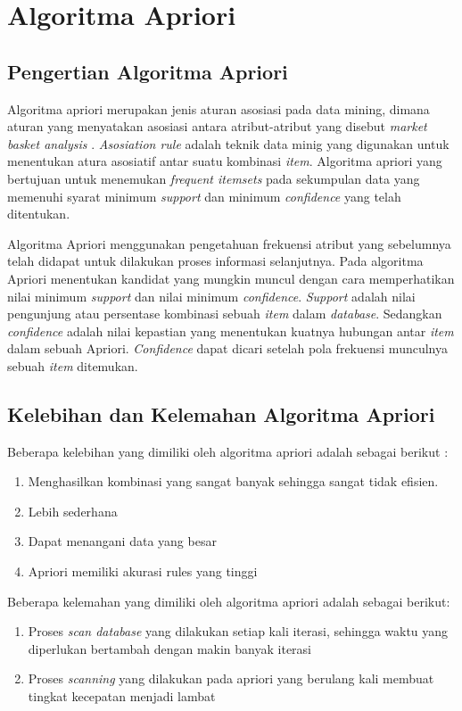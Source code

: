 \section{Algoritma Apriori}
\subsection{Pengertian Algoritma Apriori}
Algoritma apriori merupakan jenis aturan asosiasi pada data mining, dimana aturan yang menyatakan asosiasi antara atribut-atribut yang disebut \textit{market basket analysis} \cite{ye2006parallel}. \textit{Asosiation rule} adalah teknik data minig yang digunakan untuk menentukan atura asosiatif antar suatu kombinasi \textit{item}. Algoritma apriori yang bertujuan untuk menemukan \textit{frequent itemsets} pada sekumpulan data yang memenuhi syarat minimum \textit{support} dan minimum \textit{confidence} yang telah ditentukan.
\par
Algoritma Apriori menggunakan pengetahuan frekuensi atribut yang  sebelumnya telah didapat untuk dilakukan proses informasi selanjutnya. Pada algoritma Apriori  menentukan kandidat yang mungkin muncul dengan cara memperhatikan nilai minimum \textit{support} dan nilai minimum \textit{confidence}. \textit{Support} adalah nilai pengunjung atau persentase kombinasi sebuah \textit{item} dalam \textit{database}. Sedangkan \textit{confidence} adalah nilai kepastian yang menentukan kuatnya hubungan antar \textit{item} dalam sebuah Apriori. \textit{Confidence} dapat dicari setelah pola frekuensi munculnya sebuah \textit{item} ditemukan.


\subsection{Kelebihan dan Kelemahan Algoritma Apriori}
\par Beberapa kelebihan yang dimiliki oleh algoritma apriori adalah sebagai berikut \cite{fauzy2016penerapan}:
 \begin{enumerate}
\item Menghasilkan kombinasi yang sangat banyak sehingga sangat tidak efisien. 
\item Lebih sederhana
\item Dapat menangani data yang besar
\item Apriori memiliki akurasi rules yang tinggi
\end{enumerate}

\par Beberapa kelemahan yang dimiliki oleh algoritma apriori adalah sebagai berikut:
 \begin{enumerate}
\item Proses \textit{scan database} yang dilakukan setiap kali iterasi, sehingga waktu yang diperlukan bertambah dengan makin banyak iterasi
\item Proses \textit{scanning} yang
dilakukan pada apriori yang berulang kali membuat tingkat kecepatan menjadi lambat

\end{enumerate}

